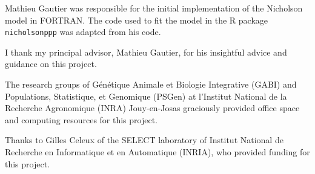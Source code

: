 \documentclass[a4paper,12pt]{article}
\begin{document}
Mathieu Gautier was responsible for the initial implementation of the
Nicholson model in FORTRAN. The code used to fit the model in the R
package \texttt{nicholsonppp} was adapted from his code.

I thank my principal advisor, Mathieu Gautier, for his insightful
advice and guidance on this project.

The research groups of G\'en\'etique Animale et Biologie Integrative
(GABI) and Populations, Statistique, et Genomique (PSGen) at
l'Institut National de la Recherche Agronomique (INRA) Jouy-en-Josas
graciously provided office space and computing resources for this
project.

Thanks to Gilles Celeux of the SELECT laboratory of Institut National
de Recherche en Informatique et en Automatique (INRIA), who provided
funding for this project.



\end{document}
